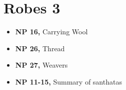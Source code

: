 \chapter{Robes 3}

\begin{itemize}
\tightlist
\item
  \textbf{NP 16,} Carrying Wool
\item
  \textbf{NP 26,} Thread
\item
  \textbf{NP 27,} Weavers
\item
  \textbf{NP 11-15,} Summary of santhatas
\end{itemize}

